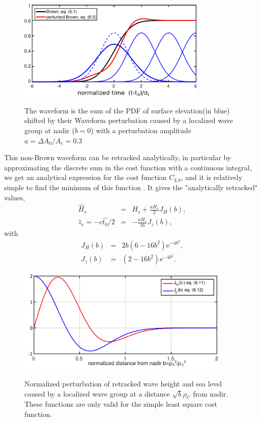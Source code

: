 \begin{figure}[htb]
\centerline{\includegraphics[width=0.8\textwidth]{FIGS_CH_SAT/waveforms_perturbation.pdf}}
  \caption{The waveform is the sum of the PDF of surface elevation(in blue) shifted by their Waveform perturbation caused by a localized wave group at nadir ($b=0$) with a perturbation amplitude $a=\Delta A_0/A_e=0.3$}{} \label{fig:group_alti_perturb}
\end{figure}

This non-Brown waveform can be retracked analytically, in particular by approximating the discrete sum in the cost function with a continuous integral, we get an analytical expression for the cost function $C_{LS}$, and it is relatively simple to find the minimum of this function \citep{DeCarlo&al.2023}. It gives the "analytically retracked" values, 
 \begin{eqnarray}
    \widehat{H}_{s}&=& H_s +  \frac{a H_s }{2}  J_H(b), \label{eq:Hsfit}\\
    \widehat{z}_e= - c \widehat{t_0} / 2 & =& - \frac{a H_s}{16} J_z(b),\label{eq:epochfit}
\end{eqnarray}
with 
 \begin{eqnarray}
    J_H(b)&=& 2 b \left(6- 16 b^2\right) \mathrm{e}^{-4b^2},\label{eq:JH}\\
    J_z(b)&=&   \left(2-16 b^2\right) \mathrm{e}^{-4 b^2}.\label{eq:Jz}
\end{eqnarray}


\begin{figure}[h!]
\centerline{\includegraphics[width=0.9\textwidth]{FIGS_CH_SAT/FigA3_Jfunc.pdf}}
  \caption{Normalized perturbation of retracked wave height and sea level caused by a localized wave group at a distance $\sqrt{b} \rho_C$ from nadir. These functions are only valid for the simple least square cost function.}{} \label{fig:alti_JLS}
\end{figure}

